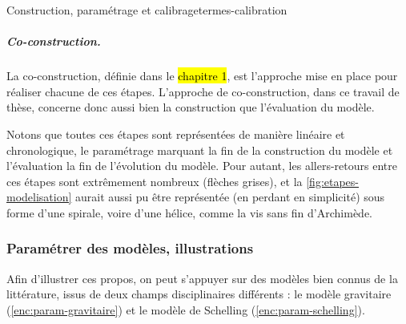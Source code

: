 \begin{encadre}{Construction, paramétrage et calibrage}{termes-calibration}
\subparagraph{Co-construction.}
La co-construction, définie dans le \hl{chapitre 1}, est l'approche mise en place pour réaliser chacune de ces étapes.
L'approche de co-construction, dans ce travail de thèse, concerne donc aussi bien la \og construction\fg{} que l'évaluation du modèle.

\medskip
\noindent Notons que toutes ces étapes sont représentées de manière linéaire et chronologique, le paramétrage marquant la fin de la construction du modèle et l'évaluation la fin de l'\og{}évolution\fg{} du modèle.
Pour autant, les allers-retours entre ces étapes sont extrêmement nombreux (flèches grises), et la \cref{fig:etapes-modelisation} aurait aussi pu être représentée (en perdant en simplicité) sous forme d'une spirale, voire d'une hélice, comme la \og vis sans fin\fg{} d'Archimède.

\end{encadre}

\clearpage
\subsubsection{Paramétrer des modèles, illustrations}
Afin d'illustrer ces propos, on peut s'appuyer sur des modèles bien connus de la littérature, issus de deux champs disciplinaires différents : le modèle gravitaire (\cref{enc:param-gravitaire}) et le modèle de Schelling (\cref{enc:param-schelling}).



